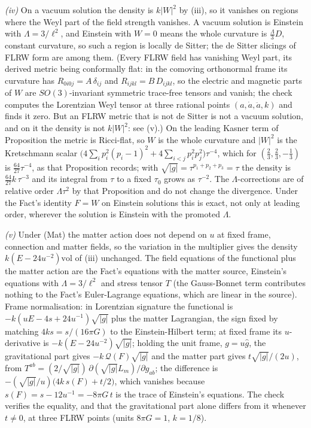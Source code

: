 \emph{(iv)} On a vacuum solution the density is $k|W|^{2}$ by (iii), so it vanishes on regions where the Weyl part of the field strength vanishes. A vacuum solution is Einstein with $\Lambda = 3/\ell^{2}$, and Einstein with $W = 0$ means the whole curvature is $\tfrac{\Lambda}{3}D$, constant curvature, so such a region is locally de Sitter; the de Sitter slicings of FLRW form are among them. (Every FLRW field has vanishing Weyl part, its derived metric being conformally flat: in the comoving orthonormal frame its curvature has $R_{0i0j} = A\,\delta_{ij}$ and $R_{ijkl} = B\,D_{ijkl}$, so the electric and magnetic parts of $W$ are $SO(3)$-invariant symmetric trace-free tensors and vanish; the check computes the Lorentzian Weyl tensor at three rational points $(a, \dot a, \ddot a, k)$ and finds it zero. But an FLRW metric that is not de Sitter is not a vacuum solution, and on it the density is not $k|W|^{2}$: see (v).) On the leading Kasner term of Proposition  the metric is Ricci-flat, so $W$ is the whole curvature and $|W|^{2}$ is the Kretschmann scalar $\bigl(4\sum_{i}p_{i}^{2}(p_{i} - 1)^{2} + 4\sum_{i<j}p_{i}^{2}p_{j}^{2}\bigr)\tau^{-4}$, which for $(\tfrac23, \tfrac23, -\tfrac13)$ is $\tfrac{64}{27}\tau^{-4}$, as that Proposition records; with $\sqrt{|g|} = \tau^{p_{1}+p_{2}+p_{3}} = \tau$ the density is $\tfrac{64}{27}k\,\tau^{-3}$ and its integral from $\tau$ to a fixed $\tau_{0}$ grows as $\tau^{-2}$. The $\Lambda$-corrections are of relative order $\Lambda\tau^{2}$ by that Proposition and do not change the divergence. Under the Fact's identity $F = W$ on Einstein solutions this is exact, not only at leading order, wherever the solution is Einstein with the promoted $\Lambda$.

\emph{(v)} Under (Mat) the matter action does not depend on $u$ at fixed frame, connection and matter fields, so the variation in the multiplier gives the density $k(E - 24u^{-2})\mathrm{vol}$ of (iii) unchanged. The field equations of the functional plus the matter action are the Fact's equations with the matter source, Einstein's equations with $\Lambda = 3/\ell^{2}$ and stress tensor $T$ (the Gauss-Bonnet term contributes nothing to the Fact's Euler-Lagrange equations, which are linear in the source). Frame normalisation: in Lorentzian signature the functional is $-k(uE - 4s + 24u^{-1})\sqrt{|g|}$ plus the matter Lagrangian, the sign fixed by matching $4ks = s/(16\pi G)$ to the Einstein-Hilbert term; at fixed frame its $u$-derivative is $-k(E - 24u^{-2})\sqrt{|g|}$; holding the unit frame, $g = u\hat g$, the gravitational part gives $-k\,\mathcal{Q}(F)\sqrt{|g|}$ and the matter part gives $t\sqrt{|g|}/(2u)$, from $T^{ab} = (2/\sqrt{|g|})\,\partial(\sqrt{|g|}L_{m})/\partial g_{ab}$; the difference is $-(\sqrt{|g|}/u)\bigl(4k\,s(F) + t/2\bigr)$, which vanishes because $s(F) = s - 12u^{-1} = -8\pi G\,t$ is the trace of Einstein's equations. The check verifies the equality, and that the gravitational part alone differs from it whenever $t \neq 0$, at three FLRW points (units $8\pi G = 1$, $k = 1/8$).

